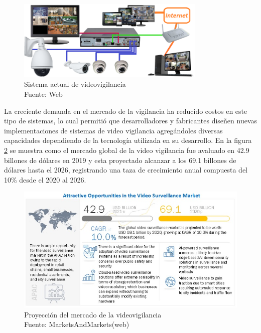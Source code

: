 \begin{figure}[H]
    \begin{center}
        \includegraphics[width=9cm]{img/capitulo_2/sis_videovigilancia.png}
    \end{center}
    \caption{Sistema actual de videovigilancia\\Fuente: Web}
    \label{fig:sistema_video_vigilancia}
\end{figure}

La creciente demanda en el mercado de la vigilancia ha reducido costos en este tipo de sistemas, lo cual permitió que desarrolladores y fabricantes diseñen nuevas implementaciones de sistemas de video vigilancia agregándoles diversas capacidades dependiendo de la tecnología utilizada en su desarrollo. En la figura \ref{fig:surveillance-market} se muestra como el mercado global de la video vigilancia fue avaluado en 42.9 billones de dólares en 2019 y esta proyectado alcanzar a los 69.1 billones de dólares hasta el 2026, registrando una taza de crecimiento anual compuesta del 10\% desde el 2020 al 2026. \cite{marketsandmarkets:market-surveillance}\\

\begin{figure}[H]
    \begin{center}
        \includegraphics[width=13cm]{img/capitulo_2/surveillance-market.jpg}
    \end{center}
    \caption{Proyección del mercado de la videovigilancia\\Fuente: MarketsAndMarkets(web)}
    \label{fig:surveillance-market}
\end{figure}

